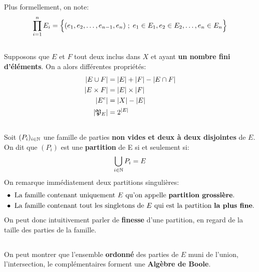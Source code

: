 Plus formellement, on note:
\[
     \prod_{i=1}^{n} E_i = \Bigl\{ (e_1, e_2, \ldots, e_{n-1}, e_n) \; ; \; e_1 \in E_1, e_2 \in E_2, \ldots,  e_n \in E_n \Bigl\}
\]
\subsection*{}
Supposons que \(E\) et \(F\) tout deux inclus dans \(X\) et ayant \textbf{un nombre fini d'éléments}. On a alors différentes propriétés:
\begin{align*}
   |E \cup F| &= |E| + |F| - |E \cap F| \\
   |E \times F| &= |E| \times |F| \\
   |E^c| &= |X| - |E| \\
   |\mathbf{\mathfrak{P}}_E| &= 2^{|E|}
\end{align*}

\subsection*{}
Soit \((P_i)_{i \in \mathbb{N}}\) une famille de parties \textbf{non vides et deux à deux disjointes} de \(E\).\+
On dit que \((P_i)\) est une \textbf{partition} de E si et seulement si:
\[
    \bigcup_{i \in \mathbb{N}} P_i = E
\]
On remarque immédiatement deux partitions singulières:
\begin{align*}
    &\bullet \text{ La famille contenant uniquement } E \text{ qu'on appelle \textbf{partition grossière}.} \\
    &\bullet \text{ La famille contenant tout les singletons de } E \text{ qui est la partition \textbf{la plus fine}.}
\end{align*}
On peut donc intuitivement parler de \textbf{finesse} d'une partition, en regard de la taille des parties de la famille.

\subsection*{}
On peut montrer que l'ensemble \textbf{ordonné} des parties de \(E\) muni de l'union, l'intersection, le complémentaires forment une \textbf{Algèbre de Boole}.\<

